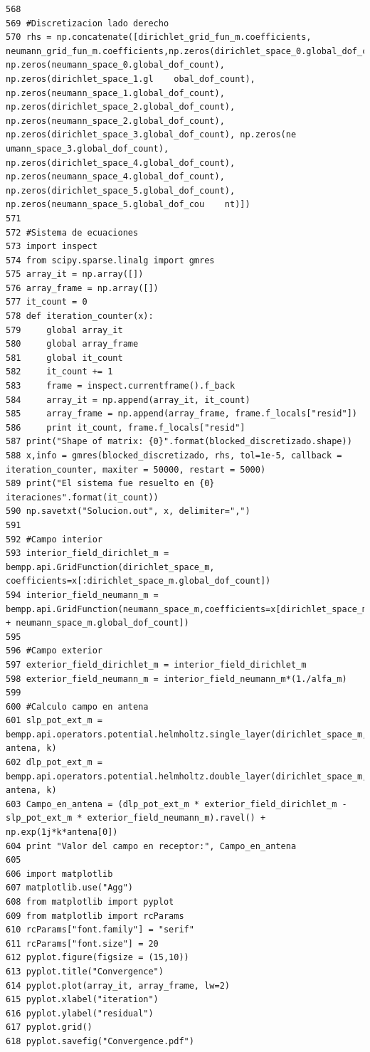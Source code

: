 \documentclass[12pt,letterpaper]{article}
\numberwithin{equation}{section}
\begin{document}
\begin{lstlisting}
568 
569 #Discretizacion lado derecho
570 rhs = np.concatenate([dirichlet_grid_fun_m.coefficients, neumann_grid_fun_m.coefficients,np.zeros(dirichlet_space_0.global_dof_count), np.zeros(neumann_space_0.global_dof_count), np.zeros(dirichlet_space_1.gl    obal_dof_count), np.zeros(neumann_space_1.global_dof_count), np.zeros(dirichlet_space_2.global_dof_count), np.zeros(neumann_space_2.global_dof_count), np.zeros(dirichlet_space_3.global_dof_count), np.zeros(ne    umann_space_3.global_dof_count), np.zeros(dirichlet_space_4.global_dof_count), np.zeros(neumann_space_4.global_dof_count), np.zeros(dirichlet_space_5.global_dof_count), np.zeros(neumann_space_5.global_dof_cou    nt)])
571 
572 #Sistema de ecuaciones
573 import inspect
574 from scipy.sparse.linalg import gmres
575 array_it = np.array([])
576 array_frame = np.array([])
577 it_count = 0
578 def iteration_counter(x):
579     global array_it
580     global array_frame
581     global it_count
582     it_count += 1
583     frame = inspect.currentframe().f_back
584     array_it = np.append(array_it, it_count)
585     array_frame = np.append(array_frame, frame.f_locals["resid"])
586     print it_count, frame.f_locals["resid"]
587 print("Shape of matrix: {0}".format(blocked_discretizado.shape))
588 x,info = gmres(blocked_discretizado, rhs, tol=1e-5, callback = iteration_counter, maxiter = 50000, restart = 5000)
589 print("El sistema fue resuelto en {0} iteraciones".format(it_count))
590 np.savetxt("Solucion.out", x, delimiter=",")
591 
592 #Campo interior
593 interior_field_dirichlet_m = bempp.api.GridFunction(dirichlet_space_m, coefficients=x[:dirichlet_space_m.global_dof_count])
594 interior_field_neumann_m = bempp.api.GridFunction(neumann_space_m,coefficients=x[dirichlet_space_m.global_dof_count:dirichlet_space_m.global_dof_count + neumann_space_m.global_dof_count])
595 
596 #Campo exterior
597 exterior_field_dirichlet_m = interior_field_dirichlet_m
598 exterior_field_neumann_m = interior_field_neumann_m*(1./alfa_m)
599 
600 #Calculo campo en antena
601 slp_pot_ext_m = bempp.api.operators.potential.helmholtz.single_layer(dirichlet_space_m, antena, k)
602 dlp_pot_ext_m = bempp.api.operators.potential.helmholtz.double_layer(dirichlet_space_m, antena, k)
603 Campo_en_antena = (dlp_pot_ext_m * exterior_field_dirichlet_m - slp_pot_ext_m * exterior_field_neumann_m).ravel() + np.exp(1j*k*antena[0])
604 print "Valor del campo en receptor:", Campo_en_antena
605 
606 import matplotlib
607 matplotlib.use("Agg")
608 from matplotlib import pyplot
609 from matplotlib import rcParams
610 rcParams["font.family"] = "serif"
611 rcParams["font.size"] = 20
612 pyplot.figure(figsize = (15,10))
613 pyplot.title("Convergence")
614 pyplot.plot(array_it, array_frame, lw=2)
615 pyplot.xlabel("iteration")
616 pyplot.ylabel("residual")
617 pyplot.grid()
618 pyplot.savefig("Convergence.pdf")

\end{lstlisting}
\end{document}
